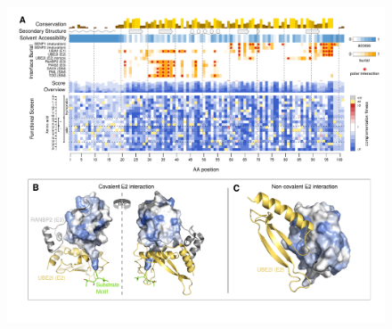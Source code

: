 \begin{appendices}
\begin{landscape}
\begin{figure}[h]
	\centering
	\includegraphics[width=9in]{img/sumo-map.pdf}
	\caption{}
\end{figure}
\end{landscape}







\end{appendices}